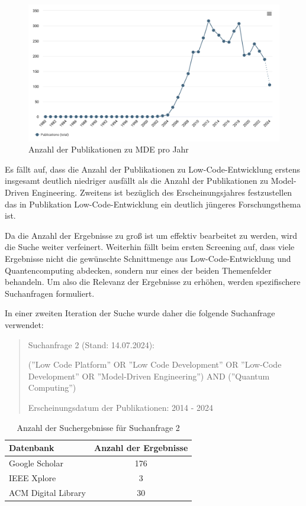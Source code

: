 \begin{figure}[h!]
    \centering
    \includegraphics[width=1\textwidth]{graphics/mde_publications_over_years.png}
    \caption{Anzahl der Publikationen zu MDE pro Jahr}
    \label{fig:publications_mde_per_year}
\end{figure}

Es fällt auf, dass die Anzahl der Publikationen zu Low-Code-Entwicklung erstens insgesamt deutlich niedriger ausfällt 
als die Anzahl der Publikationen zu Model-Driven Engineering. Zweitens ist bezüglich des Erscheinungsjahres festzustellen 
das in Publikation Low-Code-Entwicklung ein deutlich jüngeres Forschungsthema ist.

Da die Anzahl der Ergebnisse zu groß ist um effektiv bearbeitet zu werden, wird die Suche 
weiter verfeinert. Weiterhin fällt beim ersten Screening auf, dass viele Ergebnisse nicht die 
gewünschte Schnittmenge aus Low-Code-Entwicklung und Quantencomputing abdecken, sondern 
nur eines der beiden Themenfelder behandeln. Um also die Relevanz der Ergebnisse zu erhöhen, 
werden spezifischere Suchanfragen formuliert. 

In einer zweiten Iteration der Suche wurde daher die folgende Suchanfrage verwendet:

\begin{quote}
    Suchanfrage 2 (Stand: 14.07.2024):

    (''Low Code Platform'' OR ''Low Code Development'' OR ''Low-Code Development'' OR ''Model-Driven Engineering'') AND (''Quantum Computing'')

    Erscheinungsdatum der Publikationen: 2014 - 2024
\end{quote}

\begin{table}[h!]
    \centering
    \caption{Anzahl der Suchergebnisse für Suchanfrage 2}
    \label{tab:search_2_results}
    \begin{tabular}{|l|c|}
    \hline
    \textbf{Datenbank} & \textbf{Anzahl der Ergebnisse} \\ \hline
    Google Scholar & 176 \\ \hline
    IEEE Xplore & 3 \\ \hline
    ACM Digital Library & 30 \\ \hline
    \end{tabular}
\end{table}

